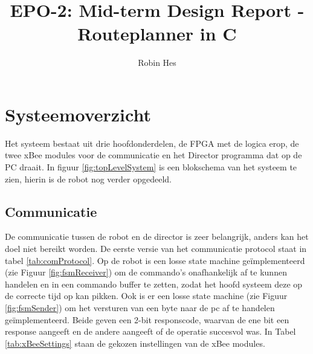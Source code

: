 \documentclass{report}
\title{EPO-2: Mid-term Design Report - Routeplanner in C}
\author{Robin Hes}
\begin{document}
\chapter{Systeemoverzicht}
\label{ch:systeem}
Het systeem bestaat uit drie hoofdonderdelen, de FPGA met de logica erop, de twee xBee modules voor de communicatie en het Director programma dat op de PC draait.
In figuur \ref{fig:topLevelSystem} is een blokschema van het systeem te zien, hierin is de robot nog verder opgedeeld. 
\section{Communicatie}
De communicatie tussen de robot en de director is zeer belangrijk, anders kan het doel niet bereikt worden.
De eerste versie van het communicatie protocol staat in tabel \ref{tab:comProtocol}.
Op de robot is een losse state machine geïmplementeerd (zie Figuur \ref{fig:fsmReceiver}) om de commando's onafhankelijk af te kunnen handelen en in een commando buffer te zetten, zodat het hoofd systeem deze op de correcte tijd op kan pikken.
Ook is er een losse state machine (zie Figuur \ref{fig:fsmSender}) om het versturen van een byte naar de pc af te handelen geïmplementeerd.
Beide geven een 2-bit responscode, waarvan de ene bit een response aangeeft en de andere aangeeft of de operatie succesvol was.
In Tabel \ref{tab:xBeeSettings} staan de gekozen instellingen van de xBee modules.
\end{document}
